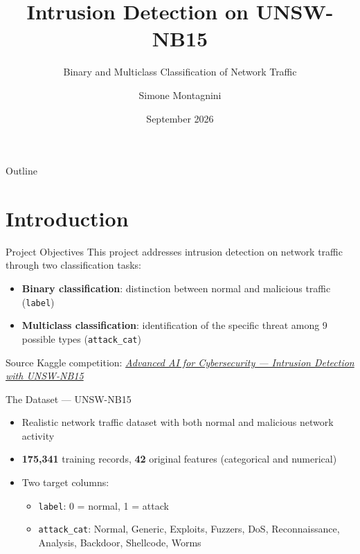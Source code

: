 \documentclass{beamer}
\title{Intrusion Detection on UNSW-NB15}
\subtitle{Binary and Multiclass Classification of Network Traffic}
\author{Simone Montagnini}
\institute{University of Bologna}
\date{September 2026}
\begin{document}
\frame{\titlepage}

\begin{frame}{Outline}
  \tableofcontents
\end{frame}

\section{Introduction}

\begin{frame}{Project Objectives}
  This project addresses intrusion detection on network traffic through two
  classification tasks:
  \begin{itemize}
    \item \textbf{Binary classification}: distinction between normal and malicious traffic
      (\texttt{label})
    \item \textbf{Multiclass classification}: identification of the specific threat among 9 possible types
      (\texttt{attack\_cat})
  \end{itemize}
  \vspace{0.5cm}
  \begin{block}{Source}
  Kaggle competition: \href{https://www.kaggle.com/competitions/advanced-ai-for-cybersecurity-intrusion-detection-with-unsw-nb-15/overview}{\textit{Advanced AI for Cybersecurity — Intrusion Detection with UNSW-NB15}}
  \end{block}
\end{frame}

\begin{frame}{The Dataset — UNSW-NB15}
  \begin{itemize}
    \item Realistic network traffic dataset with both normal and
      malicious network activity
    \item \textbf{175,341} training records, \textbf{42} original features
      (categorical and numerical)
    \item Two target columns:
      \begin{itemize}
        \item \texttt{label}: 0 = normal, 1 = attack
        \item \texttt{attack\_cat}: Normal, Generic, Exploits, Fuzzers, DoS,
          Reconnaissance, Analysis, Backdoor, Shellcode, Worms
      \end{itemize}
  \end{itemize}
\end{frame}
\end{document}
